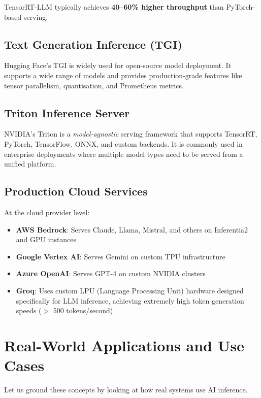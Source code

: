 \documentclass[12pt, twoside, openright]{book}
\begin{document}
TensorRT-LLM typically achieves \textbf{40--60\% higher throughput}
than PyTorch-based serving.

\subsection{Text Generation Inference (TGI)}

Hugging Face's TGI is widely used for open-source model deployment.
It supports a wide range of models and provides production-grade
features like tensor parallelism, quantisation, and Prometheus metrics.

\subsection{Triton Inference Server}

NVIDIA's Triton is a \textit{model-agnostic} serving framework that
supports TensorRT, PyTorch, TensorFlow, ONNX, and custom backends.
It is commonly used in enterprise deployments where multiple model
types need to be served from a unified platform.

\subsection{Production Cloud Services}

At the cloud provider level:
\begin{itemize}
  \item \textbf{AWS Bedrock}: Serves Claude, Llama, Mistral, and others
        on Inferentia2 and GPU instances
  \item \textbf{Google Vertex AI}: Serves Gemini on custom TPU infrastructure
  \item \textbf{Azure OpenAI}: Serves GPT-4 on custom NVIDIA clusters
  \item \textbf{Groq}: Uses custom LPU (Language Processing Unit) hardware
        designed specifically for LLM inference, achieving extremely
        high token generation speeds ($>$ 500 tokens/second)
\end{itemize}

\section{Real-World Applications and Use Cases}

Let us ground these concepts by looking at how real systems use
AI inference.
\end{document}
